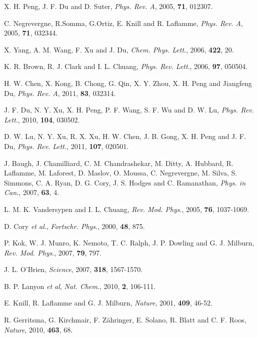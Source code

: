 \documentclass[8.5pt,twoside,twocolumn]{article}
\begin{document}
\begin{thebibliography}{99}
X. H. Peng, J. F. Du and D. Suter, \emph{Phys. Rev. A}, 2005, \textbf{71}, 012307.

C. Negrevergne, R.Somma, G.Ortiz, E. Knill and R. Laflamme, \emph{Phys. Rev. A}, 2005, \textbf{71}, 032344.

X. Yang, A. M. Wang, F. Xu and J. Du, \emph{Chem. Phys. Lett}., 2006, \textbf{422}, 20.

K. R. Brown, R. J. Clark and I. L. Chuang, \emph{Phys. Rev. Lett}., 2006, \textbf{97}, 050504.

H. W. Chen, X. Kong, B. Chong, G. Qin, X. Y. Zhou, X. H. Peng and Jiangfeng Du, \emph{Phys. Rev. A}, 2011, \textbf{83}, 032314.

J. F. Du, N. Y. Xu, X. H. Peng, P. F. Wang, S. F. Wu and D. W. Lu, \emph{Phys. Rev. Lett}., 2010, \textbf{104}, 030502.

D. W. Lu, N. Y. Xu, R. X. Xu, H. W. Chen, J. B. Gong, X. H. Peng and J. F. Du, \emph{Phys. Rev. Lett.}, 2011, \textbf{107}, 020501.

J. Baugh, J. Chamilliard, C. M. Chandrashekar, M. Ditty, A. Hubbard, R. Laflamme, M. Laforest, D. Maslov, O. Moussa, C. Negrevergne, M. Silva, S. Simmons, C. A. Ryan, D. G. Cory, J. S. Hodges and C. Ramanathan, \emph{Phys. in Can.}, 2007, \textbf{63}, 4.

L. M. K. Vandersypen and I. L. Chuang, \emph{Rev. Mod. Phys}., 2005, \textbf{76}, 1037-1069.

D. Cory \emph{et al.}, \emph{Fortschr. Phys}., 2000, \textbf{48}, 875.

P. Kok, W. J. Munro, K. Nemoto, T. C. Ralph, J. P. Dowling and G. J. Milburn, \emph{Rev. Mod. Phys}., 2007, \textbf{79}, 797.

J. L. O'Brien, \emph{Science}, 2007,  \textbf{318}, 1567-1570.

B. P. Lanyon  \emph{et al}, \emph{Nat. Chem}., 2010, \textbf{2}, 106-111.

E. Knill, R. Laflamme and G. J. Milburn, \emph{Nature}, 2001, \textbf{409}, 46-52.


R. Gerritsma, G. Kirchmair, F. Z\"{a}hringer, E. Solano, R. Blatt and C. F. Roos, \emph{Nature}, 2010, \textbf{463}, 68.


\end{thebibliography}
\end{document}
